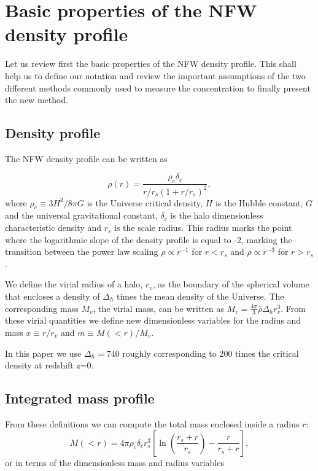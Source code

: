 \documentclass[a4,useAMS,usenatbib,usegraphicx]{mn2e}
\begin{document}
\section{Basic properties of the NFW density profile}
\label{sec:basics}

Let us review first the basic properties of the NFW density profile.
This shall help us to define our notation and review the important
assumptions of the two different methods commonly used to measure the
concentration to finally present the new method.

\subsection{Density profile}

The NFW density profile can be written as

\begin{equation}
\rho(r) = \frac{\rho_c\delta_c}{r/r_s(1+r/r_s)^2},
\label{eq:definition}
\end{equation}
%
where $\rho_c\equiv 3H^2/8\pi G$ is the Universe critical density, $H$
is the Hubble constant, $G$ and the universal gravitational constant,
$\delta_c$ is the halo dimensionless characteristic density and $r_s$
is the scale radius. 
This radius marks the point where the logarithmic slope of the density
profile is equal to -2, marking the transition between the power law
scaling $\rho\propto r^{-1}$ for $r<r_s$ and $\rho\propto r^{-3}$ for
$r>r_s$. 

We define the virial radius of a halo, $r_v$, as the boundary of the
spherical volume that encloses a density of $\Delta_h$ times the mean
density of the Universe.  
The corresponding mass $M_{v}$, the virial mass, can be written as
$M_{v} = \frac{4\pi}{3}\bar{\rho}\Delta_h r_v^3$.  
From these virial quantities we define new dimensionless variables for
the radius and mass $x\equiv r/r_v$ and $m\equiv M(<r)/M_v$. 

In this paper we use $\Delta_h=740$ roughly corresponding to 200 times
the critical density at redshift z=0.


\subsection{Integrated mass profile}

From these definitions we can compute the total mass enclosed inside a
radius $r$:
\begin{equation}
M(<r) = 4\pi\rho_c\delta_c  r_s^3\left[\ln \left
  (\frac{r_s+r}{r_s}\right) - \frac{r}{r_s+r}\right],
\end{equation}
%
or in terms of the dimensionless mass and radius variables
\end{document}
